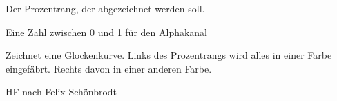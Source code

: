 \documentclass[a4paper]{book}
\begin{document}
%
\begin{Arguments}
\begin{ldescription}
\item[\code{Prozentrang}] Der Prozentrang, der abgezeichnet werden soll.

\item[\code{AlphaKanal}] Eine Zahl zwischen 0 und 1 für den Alphakanal
\end{ldescription}
\end{Arguments}
%
\begin{Details}\relax
Zeichnet eine Glockenkurve. Links des Prozentrangs wird alles in einer Farbe eingefäbrt. Rechts davon in einer anderen Farbe.
\end{Details}
%
\begin{Author}\relax
HF nach Felix Schönbrodt
\end{Author}
\printindex{}
\end{document}

